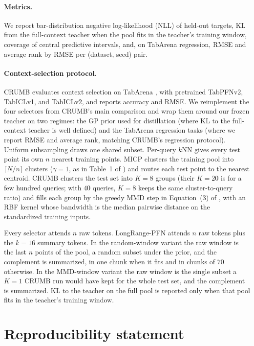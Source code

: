 \documentclass{article}
\begin{document}
\paragraph{Metrics.} We report bar-distribution negative log-likelihood (NLL)
of held-out targets, KL from the full-context teacher when the pool fits in
the teacher's training window, coverage of central predictive intervals, and,
on TabArena regression, RMSE and average rank by RMSE per (dataset, seed) pair.

\paragraph{Context-selection protocol.}
CRUMB \citep{heredge2026crumb} evaluates context selection on TabArena
\citep{erickson2025tabarena}, with pretrained TabPFNv2, TabICLv1, and
TabICLv2, and reports accuracy and RMSE. We reimplement the four selectors
from CRUMB's main comparison and wrap them around our frozen teacher on two
regimes: the GP prior used for distillation (where KL to the full-context
teacher is well defined) and the TabArena regression tasks (where we report
RMSE and average rank, matching CRUMB's regression protocol).
Uniform subsampling draws one shared subset. Per-query $k$NN gives every
test point its own $n$ nearest training points. MICP \citep{xu2024micp}
clusters the training pool into $\lceil N/n \rceil$ clusters ($\gamma = 1$,
as in Table~1 of \citet{heredge2026crumb}) and routes each test point to the nearest centroid.
CRUMB clusters the test set into $K = 8$ groups (their $K = 20$ is for a
few hundred queries; with $40$ queries, $K = 8$ keeps the same
cluster-to-query ratio) and fills each group by the greedy MMD step in
Equation~(3) of \citet{heredge2026crumb}, with an RBF kernel whose bandwidth is the median
pairwise distance on the standardized training inputs.

Every selector attends $n$ raw tokens. LongRange-PFN attends $n$ raw tokens
plus the $k = 16$ summary tokens. In the random-window variant the raw
window is the last $n$ points of the pool, a random subset under the prior,
and the complement is summarized, in one chunk when it fits and in chunks of
$70$ otherwise. In the MMD-window variant the raw window is the single
subset a $K = 1$ CRUMB run would have kept for the whole test set, and the
complement is summarized. KL to the teacher on the full pool is reported
only when that pool fits in the teacher's training window.

\section*{Reproducibility statement}
\end{document}
